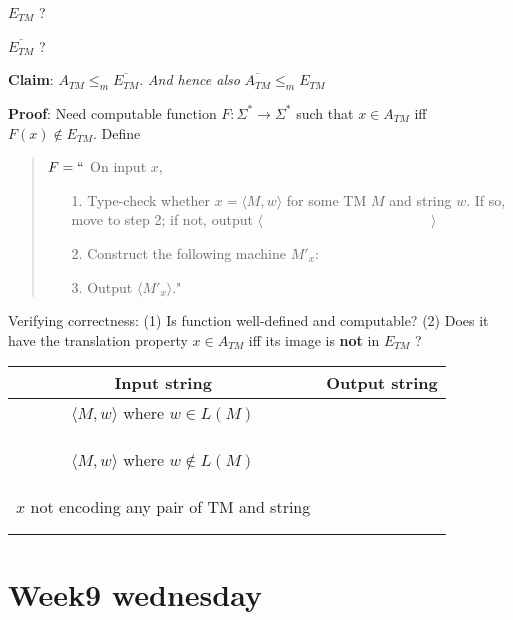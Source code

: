 \documentclass[12pt, oneside]{article}
\begin{document}
$E_{TM}$  ? 

$\overline{E_{TM}}$ ? 

\vfill


{\bf Claim}: $A_{TM}  \leq_m \overline{E_{TM}}$. {\it And hence also } $\overline{A_{TM}} \leq_m E_{TM}$

{\bf Proof}: Need computable function  $F: \Sigma^* \to \Sigma^*$  such that  $x \in A_{TM}$ iff $F(x)  \notin  E_{TM}$.
Define

\vspace{-15pt}

\begin{quote}
$F =  ``$ On input $x$,
\begin{itemize}
\item[1.] Type-check whether  $x = \langle M, w \rangle$ for some TM $M$ and string $w$. 
If so, move to step 2; if  not, output  $\langle \hspace{2in} \rangle$
\item[2.] Construct the following machine $M'_x$:
\vspace{50pt}
\item[3.] Output $\langle M'_x \rangle$."
\end{itemize}
\end{quote}

Verifying correctness: (1) Is function well-defined and computable? (2) Does it have the 
translation property $x \in A_{TM}$ iff its image is {\bf not} in $E_{TM}$ ? 
\begin{center}
\begin{tabular}{|c|c|}
\hline
Input string &  Output string \\
\hline
$\langle M, w \rangle$ where  $w \in L(M)$ & \phantom{\hspace{4in}} \\
& \\
& \\
& \\
$\langle M, w \rangle$ where $w \notin L(M)$ & \\
& \\
&\\ & \\
$x$ not encoding any pair of  TM and string   &  \\
& \\
& \\
\hline
\end{tabular}
\end{center}

\vfill \vfill
\section*{Week9 wednesday}
\end{document}
